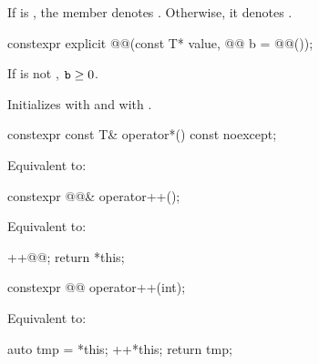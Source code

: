 \pnum
If  is ,
the member  
denotes .
Otherwise, it denotes .

%
\begin{itemdecl}
constexpr explicit @@(const T* value, @@ b = @@());
\end{itemdecl}

\begin{itemdescr}
\pnum
\expects
If  is not , $\texttt{\protect b} \ge 0$.

\pnum
\effects
Initializes  with  and
 with .
\end{itemdescr}

%
\begin{itemdecl}
constexpr const T& operator*() const noexcept;
\end{itemdecl}

\begin{itemdescr}
\pnum
\effects
Equivalent to: 
\end{itemdescr}

%
\begin{itemdecl}
constexpr @@& operator++();
\end{itemdecl}

\begin{itemdescr}
\pnum
\effects
Equivalent to:
\begin{codeblock}
++@@;
return *this;
\end{codeblock}
\end{itemdescr}

%
\begin{itemdecl}
constexpr @@ operator++(int);
\end{itemdecl}

\begin{itemdescr}
\pnum
\effects
Equivalent to:
\begin{codeblock}
auto tmp = *this;
++*this;
return tmp;
\end{codeblock}
\end{itemdescr}

